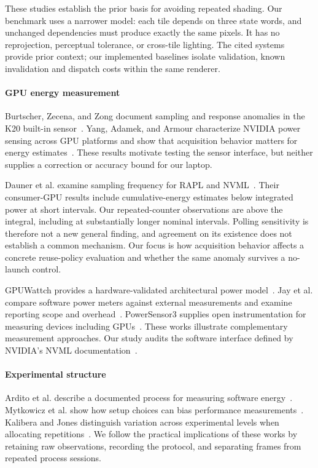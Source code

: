 \documentclass[10pt,conference]{IEEEtran}
\begin{document}
These studies establish the prior basis for avoiding repeated shading. Our benchmark uses a narrower model: each tile depends on three state words, and unchanged dependencies must produce exactly the same pixels. It has no reprojection, perceptual tolerance, or cross-tile lighting. The cited systems provide prior context; our implemented baselines isolate validation, known invalidation and dispatch costs within the same renderer.

\paragraph{GPU energy measurement}
Burtscher, Zecena, and Zong document sampling and response anomalies in the K20 built-in sensor~\cite{burtscher}. Yang, Adamek, and Armour characterize NVIDIA power sensing across GPU platforms and show that acquisition behavior matters for energy estimates~\cite{yang}. These results motivate testing the sensor interface, but neither supplies a correction or accuracy bound for our laptop.

Dauner et al. examine sampling frequency for RAPL and NVML~\cite{dauner}. Their consumer-GPU results include cumulative-energy estimates below integrated power at short intervals. Our repeated-counter observations are above the integral, including at substantially longer nominal intervals. Polling sensitivity is therefore not a new general finding, and agreement on its existence does not establish a common mechanism. Our focus is how acquisition behavior affects a concrete reuse-policy evaluation and whether the same anomaly survives a no-launch control.

GPUWattch provides a hardware-validated architectural power model~\cite{gpuwattch}. Jay et al. compare software power meters against external measurements and examine reporting scope and overhead~\cite{jay}. PowerSensor3 supplies open instrumentation for measuring devices including GPUs~\cite{powersensor}. These works illustrate complementary measurement approaches. Our study audits the software interface defined by NVIDIA's NVML documentation~\cite{nvml}.

\paragraph{Experimental structure}
Ardito et al. describe a documented process for measuring software energy~\cite{ardito}. Mytkowicz et al. show how setup choices can bias performance measurements~\cite{mytkowicz}. Kalibera and Jones distinguish variation across experimental levels when allocating repetitions~\cite{kalibera}. We follow the practical implications of these works by retaining raw observations, recording the protocol, and separating frames from repeated process sessions.
\end{document}
